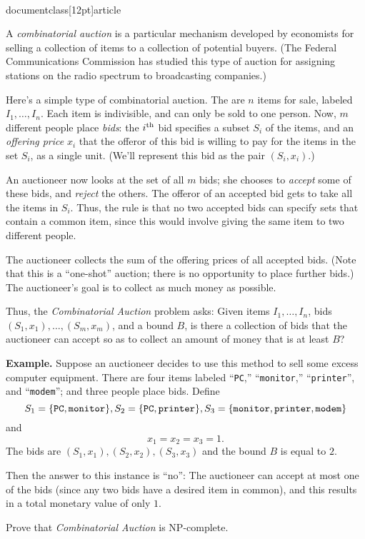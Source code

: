 \\documentclass[12pt]{article}
\begin{document}
\begin{enumerate}
A {\em combinatorial auction} is a particular mechanism
developed by economists for selling a collection
of items to a collection of potential buyers.
(The Federal Communications Commission has studied
this type of auction for
assigning stations on the radio spectrum to broadcasting companies.)

Here's a simple type of combinatorial auction.
The are $n$ items for sale, labeled $I_1, \ldots, I_n$.
Each item is indivisible, and can only be sold to one person.
Now, $m$ different people place {\em bids}:
the $i^{\rm th}$ bid specifies
a subset $S_i$ of the items, and
an {\em offering price} $x_i$ that
the offeror of this bid is willing to pay for
the items in the set $S_i$, as a single unit.
(We'll represent this bid as the pair $(S_i,x_i)$.)

An auctioneer now looks at the set of all $m$ bids;
she chooses to {\em accept} some of these bids,
and {\em reject} the others.
The offeror of an accepted bid gets to take all the items in $S_i$.
Thus, the rule is that no two accepted bids can specify
sets that contain a common item,
since this would involve giving the same item to two different people.

The auctioneer collects the sum of the offering prices
of all accepted bids.
(Note that this is a ``one-shot'' auction; there is
no opportunity to place further bids.)
The auctioneer's goal is to collect as much money as possible.

\bigskip
Thus, the {\em Combinatorial Auction} problem asks:
Given items $I_1, \ldots, I_n$,
bids $(S_1, x_1), \ldots, (S_m, x_m)$,
and a bound $B$, is there a collection of bids
that the auctioneer can accept so as to collect
an amount of money that is at least $B$?

\bigskip
{\bf Example.}  Suppose an auctioneer decides to use
this method to sell some excess computer equipment.
There are four items labeled
``{\tt PC},'' ``{\tt monitor},'' ``{\tt printer}'', and
``{\tt modem}''; and
three people place bids.
Define
$$S_1 = \{{\tt PC}, {\tt monitor}\},
S_2 = \{{\tt PC}, {\tt printer}\},
S_3 = \{{\tt monitor}, {\tt printer}, {\tt modem}\}$$
and
$$x_1 = x_2 = x_3 = 1.$$
The bids are $(S_1, x_1), (S_2, x_2), (S_3, x_3)$
and the bound $B$ is equal to $2$.

Then the answer to this instance is ``no'':
The auctioneer can accept at most one of the bids
(since any two bids have a desired item in common),
and this results in a total monetary value of only $1$.

\bigskip
Prove that {\em Combinatorial Auction} is NP-complete.










\end{enumerate}
\end{document}
